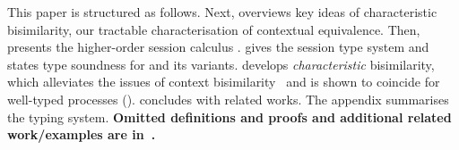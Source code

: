 
This paper 
is structured as follows.
Next,  overviews key ideas of characteristic bisimilarity, 
our 
tractable characterisation of contextual equivalence.
Then,  presents the higher-order session calculus \HOp. 
 gives the session type system
and states type soundness for \HOp and its variants.
{} 
develops %
\emph{characteristic} bisimilarity,  which 
alleviates the issues of context bisimilarity~\cite{San96H} and is shown  
to coincide for well-typed \HOp processes ().
 concludes with related works. The appendix summarises the typing system. 
\textbf{Omitted definitions and proofs and additional related work/examples  
are 
in~\cite{KouzapasPY15}.} 

